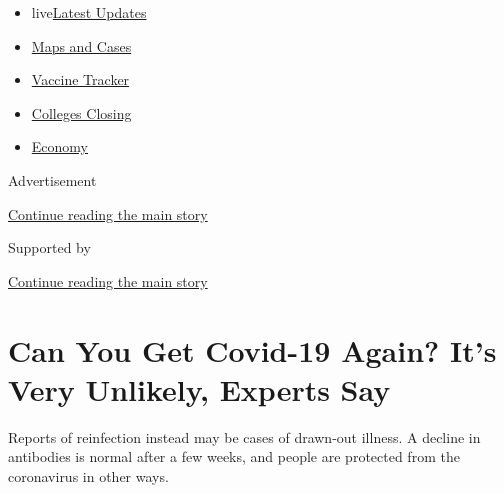 \begin{itemize}
\tightlist
\item
  live\href{https://www.nytimes3xbfgragh.onion/2020/08/21/world/covid-19-coronavirus.html?name=styln-coronavirus-national\&region=TOP_BANNER\&variant=undefined\&block=storyline_menu_recirc\&action=click\&pgtype=Article\&impression_id=05d9e0f1-e3a7-11ea-a0fd-ad25549458e4}{Latest
  Updates}
\item
  \href{https://www.nytimes3xbfgragh.onion/interactive/2020/us/coronavirus-us-cases.html?name=styln-coronavirus-national\&region=TOP_BANNER\&variant=undefined\&block=storyline_menu_recirc\&action=click\&pgtype=Article\&impression_id=05da0800-e3a7-11ea-a0fd-ad25549458e4}{Maps
  and Cases}
\item
  \href{https://www.nytimes3xbfgragh.onion/interactive/2020/science/coronavirus-vaccine-tracker.html?name=styln-coronavirus-national\&region=TOP_BANNER\&variant=undefined\&block=storyline_menu_recirc\&action=click\&pgtype=Article\&impression_id=05da0801-e3a7-11ea-a0fd-ad25549458e4}{Vaccine
  Tracker}
\item
  \href{https://www.nytimes3xbfgragh.onion/2020/08/19/us/colleges-closing-covid.html?name=styln-coronavirus-national\&region=TOP_BANNER\&variant=undefined\&block=storyline_menu_recirc\&action=click\&pgtype=Article\&impression_id=05da0802-e3a7-11ea-a0fd-ad25549458e4}{Colleges
  Closing}
\item
  \href{https://www.nytimes3xbfgragh.onion/live/2020/08/20/business/stock-market-today-coronavirus?name=styln-coronavirus-national\&region=TOP_BANNER\&variant=undefined\&block=storyline_menu_recirc\&action=click\&pgtype=Article\&impression_id=05da0803-e3a7-11ea-a0fd-ad25549458e4}{Economy}
\end{itemize}

Advertisement

\protect\hyperlink{after-top}{Continue reading the main story}

Supported by

\protect\hyperlink{after-sponsor}{Continue reading the main story}

\hypertarget{can-you-get-covid-19-again-its-very-unlikely-experts-say}{%
\section{Can You Get Covid-19 Again? It's Very Unlikely, Experts
Say}\label{can-you-get-covid-19-again-its-very-unlikely-experts-say}}

Reports of reinfection instead may be cases of drawn-out illness. A
decline in antibodies is normal after a few weeks, and people are
protected from the coronavirus in other ways.

